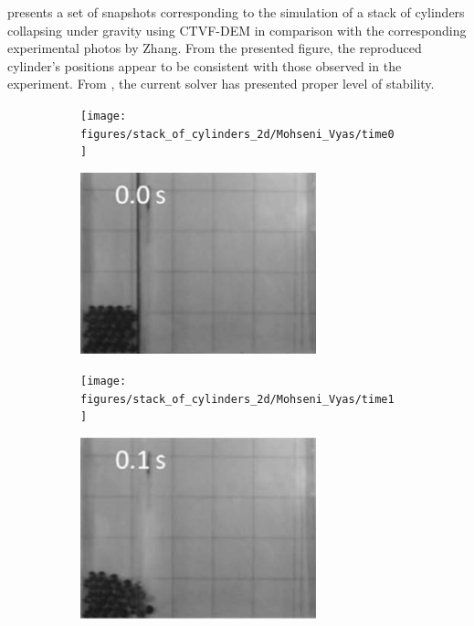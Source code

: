 \documentclass[preprint,12pt]{elsarticle}
\begin{document}
 presents a set of snapshots
corresponding to the simulation of a stack of cylinders collapsing under
gravity using CTVF-DEM in comparison with the corresponding experimental
photos by Zhang. From the presented figure, the reproduced cylinder's
positions appear to be consistent with those observed in the experiment. From
, the current solver has presented
proper level of stability.



\begin{figure}[!htpb]
  \centering
  \begin{subfigure}{0.48\textwidth}
    \centering
    \texttt{[image: figures/stack\_of\_cylinders\_2d/Mohseni\_Vyas/time0]}
  \end{subfigure}
  \begin{subfigure}{0.48\textwidth}
    \centering
    \includegraphics[width=0.75\textwidth]{images/stack_of_cylinders_experimental_images/time0}
  \end{subfigure}

  \begin{subfigure}{0.48\textwidth}
    \centering
    \texttt{[image: figures/stack\_of\_cylinders\_2d/Mohseni\_Vyas/time1]}
  \end{subfigure}
  \begin{subfigure}{0.48\textwidth}
    \centering
    \includegraphics[width=0.75\textwidth]{images/stack_of_cylinders_experimental_images/time1}
  \end{subfigure}


\end{figure}
\end{document}
